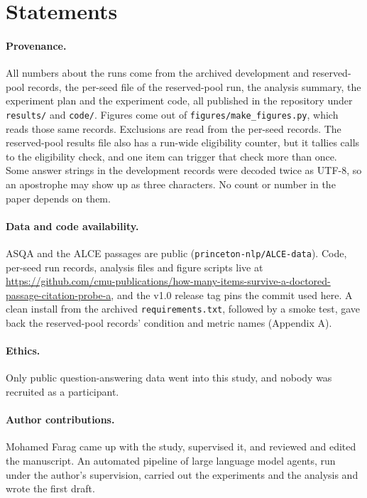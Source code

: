 \documentclass[11pt]{article}
\begin{document}
\section*{Statements}\label{statements}

\paragraph{Provenance.} All numbers about the runs come from the archived development and reserved-pool records, the per-seed file of the reserved-pool run, the analysis summary, the experiment plan and the experiment code, all published in the repository under \texttt{results/} and \texttt{code/}. Figures come out of \texttt{figures/make\_figures.py}, which reads those same records. Exclusions are read from the per-seed records. The reserved-pool results file also has a run-wide eligibility counter, but it tallies calls to the eligibility check, and one item can trigger that check more than once. Some answer strings in the development records were decoded twice as UTF-8, so an apostrophe may show up as three characters. No count or number in the paper depends on them.

\paragraph{Data and code availability.} ASQA and the ALCE passages are public (\texttt{princeton-nlp/ALCE-data}). Code, per-seed run records, analysis files and figure scripts live at \url{https://github.com/cmu-publications/how-many-items-survive-a-doctored-passage-citation-probe-a}, and the v1.0 release tag pins the commit used here. A clean install from the archived \texttt{requirements.txt}, followed by a smoke test, gave back the reserved-pool records' condition and metric names (Appendix A).

\paragraph{Ethics.} Only public question-answering data went into this study, and nobody was recruited as a participant.

\paragraph{Author contributions.} Mohamed Farag came up with the study, supervised it, and reviewed and edited the manuscript. An automated pipeline of large language model agents, run under the author's supervision, carried out the experiments and the analysis and wrote the first draft.
\end{document}
